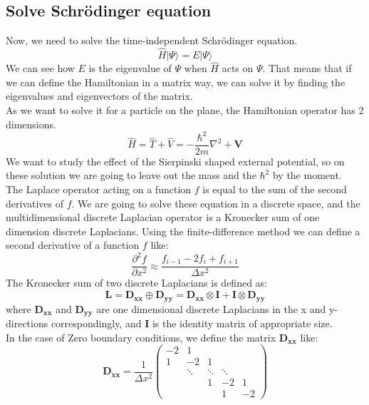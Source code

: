 \documentclass[aps,prl,reprint,onecolumn,superscriptaddress,floatfix,longbibliography]{revtex4-2}
\begin{document}
\subsection{Solve Schrödinger equation}
Now, we need to solve the time-independent Schrödinger equation.
\begin{equation}
\hat {H} |\Psi \rangle = E |\Psi \rangle
\end{equation}
We can see how $E$ is the eigenvalue of $\Psi$ when $\hat{H}$ acts on $\Psi$. That means that if we can define the Hamiltonian in a matrix way, we can solve it by finding the eigenvalues and eigenvectors of the matrix.\\
As we want to solve it for a particle on the plane, the Hamiltonian operator has 2 dimensions.\\
\begin{equation}
\hat {H} = \hat {T} + \hat {V} = -\frac{\hbar^{2}}{2m} \nabla^{2} + \mathbf{V}
\end{equation}
We want to study the effect of the Sierpinski shaped external potential, so on these solution we are going to leave out the mass and the $\hbar^{2}$ by the moment.\\
The Laplace operator acting on a function $f$ is equal to the sum of the second derivatives of $f$.
We are going to solve these equation in a discrete space, and the multidimensional discrete Laplacian operator is a Kronecker sum of one dimension discrete Laplacians. Using the finite-difference method we can define a second derivative of a function $f$ like:
\begin{equation}
\frac{\partial^{2}f}{\partial x^2} \approx \frac{f_{i-1} - 2f_{i} + f_{i+1}}{\Delta x^{2}}
\end{equation}
The Kronecker sum of two discrete Laplacians is defined as:
\begin{equation}
\mathbf{L}=\mathbf{D_{xx}} \oplus \mathbf{D_{yy}}=\mathbf{D_{xx}} \otimes \mathbf{I} + \mathbf{I} \otimes \mathbf{D_{yy}}
\end{equation}
where $\mathbf{D_{xx}}$ and $\mathbf{D_{yy}}$ are one dimensional discrete Laplacians in the x and y-directions correspondingly, and $\mathbf{I}$ is the identity matrix of appropriate size.\\
In the case of Zero boundary conditions, we define the matrix $\mathbf{D_{xx}}$ like:
\begin{equation}
\mathbf{D_{xx}} = \frac{1}{\Delta x^{2}}
\begin{pmatrix} 
-2 & 1 & & & \\
1 & -2 & 1 & & \\
& \ddots & \ddots & \ddots &  \\
& & 1 & -2 & 1 \\
& & & 1 & -2
\end{pmatrix}
\end{equation}
\end{document}
